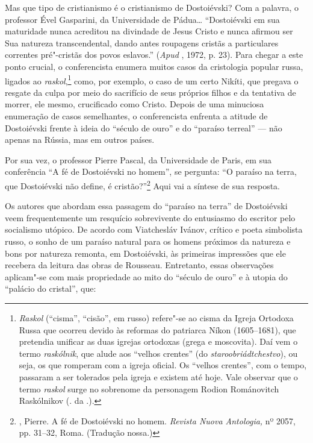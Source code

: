 Mas que tipo de cristianismo é o cristianismo de Dostoiévski? Com a
palavra, o professor Ével Gasparini, da Universidade de Pádua\ldots{}
``Dostoiévski em sua maturidade nunca acreditou na divindade de Jesus
Cristo e nunca afirmou ser Sua natureza transcendental, dando antes
roupagens cristãs a particulares correntes pré"-cristãs dos povos
eslavos.'' (\emph{Apud} , 1972, p. 23). Para chegar a este ponto
crucial, o conferencista enumera muitos casos da cristologia popular
russa, ligados ao \emph{raskol},\footnote{\emph{Raskol} (``cisma'',
  ``cisão'', em russo) refere"-se ao cisma da Igreja Ortodoxa Russa que
  ocorreu devido às reformas do patriarca Níkon (1605--1681), que
  pretendia unificar as duas igrejas ortodoxas (grega e moscovita). Daí
  vem o termo \emph{raskólnik}, que alude aos ``velhos crentes'' (do
  \emph{staroobriádtchestvo}), ou seja, os que romperam com a igreja
  oficial. Os ``velhos crentes'', com o tempo, passaram a ser tolerados
  pela igreja e existem até hoje. Vale observar que o termo
  \emph{raskol} surge no sobrenome da personagem Rodion Románovitch
  Raskólnikov (. da .).} como, por exemplo, o caso de um certo
Nikíti, que pregava o resgate da culpa por meio do sacrifício de seus
próprios filhos e da tentativa de morrer, ele mesmo, crucificado como
Cristo. Depois de uma minuciosa enumeração de casos semelhantes, o
conferencista enfrenta a atitude de Dostoiévski frente à ideia do
``século de ouro'' e do ``paraíso terreal'' --- não apenas na Rússia, mas
em outros países.

Por sua vez, o professor Pierre Pascal, da Universidade de Paris, em sua
conferência ``A fé de Dostoiévski no homem'', se pergunta: ``O paraíso
na terra, que Dostoiévski não define, é cristão?''\footnote{,
  Pierre. A fé de Dostoiévski no homem. \emph{Revista Nuova Antologia,}
  nº 2057, pp. 31--32, Roma. (Tradução nossa.)} Aqui vai a síntese de sua
resposta.

Os autores que abordam essa passagem do ``paraíso na terra'' de
Dostoiévski veem frequentemente um resquício sobrevivente do entusiasmo
do escritor pelo socialismo utópico. De acordo com Viatchesláv Ivánov,
crítico e poeta simbolista russo, o sonho de um paraíso natural para os
homens próximos da natureza e bons por natureza remonta, em Dostoiévski,
às primeiras impressões que ele recebera da leitura das obras de
Rousseau. Entretanto, essas observações aplicam"-se com mais propriedade
ao mito do ``século de ouro'' e à utopia do ``palácio do cristal'', que:

